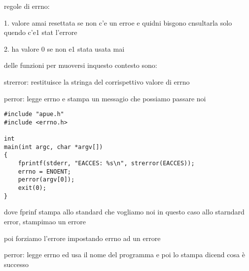 regole di errno:

1. valore amai resettata se non c'e un erroe e quidni bisgono cnsultarla solo quendo c'e1 stat l'errore

2. ha valore 0 se non e1 stata usata mai

delle funzioni per muoversi inquesto contesto sono:

strerror: restituisce la stringa del corrispettivo valore di errno


perror: legge errno e stampa un messagio che possiamo passare noi


\begin{lstlisting}
#include "apue.h"
#include <errno.h>

int
main(int argc, char *argv[])
{
	fprintf(stderr, "EACCES: %s\n", strerror(EACCES));
	errno = ENOENT;
	perror(argv[0]);
	exit(0);
}
\end{lstlisting}


dove fprinf stampa allo standard che vogliamo noi in questo caso allo starndard error, stampimao un errore

poi forziamo l'errore impostando errno ad un errore

perror: legge errno ed usa il nome del programma e poi lo stampa dicend cosa è successo



